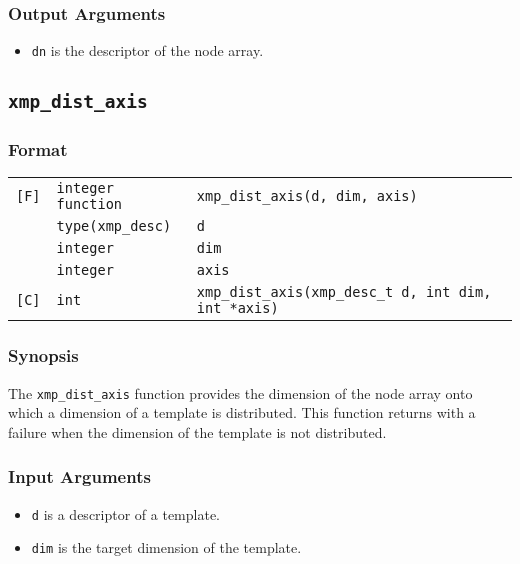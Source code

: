 \subsubsection*{Output Arguments}
\begin{itemize}
 \item {\tt dn} is the descriptor of the node array.
\end{itemize}


\subsection{\tt xmp\_dist\_axis}

\subsubsection*{Format}

\begin{tabular}{lll}

\verb![F]!& {\tt integer function}& {\tt xmp\_dist\_axis(d, dim, axis)}\\
          & {\tt type(xmp\_desc)} & {\tt d}\\
          & {\tt integer} & {\tt dim}\\
          & {\tt integer} & {\tt axis}\\

\verb![C]!&  {\tt int}& {\tt xmp\_dist\_axis(xmp\_desc\_t d, int dim, int *axis)}\\

\end{tabular}

\subsubsection*{Synopsis}

The {\tt xmp\_dist\_axis} function provides the dimension of the node
array onto which a dimension of a template is distributed. This function
returns with a failure when the dimension of the template is not
distributed.

\subsubsection*{Input Arguments}
\begin{itemize}
 \item {\tt d} is a descriptor of a template.
 \item {\tt dim} is the target dimension of the template.
\end{itemize}

